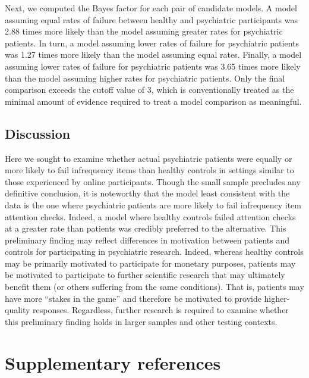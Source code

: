 \documentclass[a4paper,notitlepage,12pt]{article}
\begin{document}
\begin{refsection}[supp]
Next, we computed the Bayes factor for each pair of candidate models. A model assuming equal rates of failure between healthy and psychiatric participants was 2.88 times more likely than the model assuming greater rates for psychiatric patients. In turn, a model assuming lower rates of failure for psychiatric patients was 1.27 times more likely than the model assuming equal rates. Finally, a model assuming lower rates of failure for psychiatric patients was 3.65 times more likely than the model assuming higher rates for psychiatric patients. Only the final comparison exceeds the cutoff value of 3, which is conventionally treated as the minimal amount of evidence required to treat a model comparison as meaningful.  

\subsection*{Discussion}

Here we sought to examine whether actual psychiatric patients were equally or more likely to fail infrequency items than healthy controls in settings similar to those experienced by online participants. Though the small sample precludes any definitive conclusion, it is noteworthy that the model least consistent with the data is the one where psychiatric patients are more likely to fail infrequency item attention checks. Indeed, a model where healthy controls failed attention checks at a greater rate than patients was credibly preferred to the alternative. This preliminary finding may reflect differences in motivation between patients and controls for participating in psychiatric research. Indeed, whereas healthy controls may be primarily motivated to participate for monetary purposes, patients may be motivated to participate to further scientific research that may ultimately benefit them (or others suffering from the same conditions). That is, patients may have more ``stakes in the game'' and therefore be motivated to provide higher-quality responses. Regardless, further research is required to examine whether this preliminary finding holds in larger samples and other testing contexts. 

\section*{Supplementary references}

\printbibliography[heading=supp]
\end{refsection}
\end{document}

